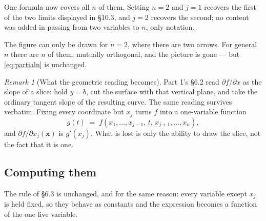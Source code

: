 \documentclass[11pt]{article}
\theoremstyle{plain}
\theoremstyle{definition}
\theoremstyle{remark}
\newtheorem*{rmk}{Remark}
\newcommand{\vc}[1]{\mathbf{#1}}
\begin{document}
\noindent One formula now covers all $n$ of them. Setting $n=2$ and $j=1$
recovers the first of the two limits displayed in \S10.3, and $j=2$ recovers the
second; no content was added in passing from two variables to $n$, only
notation.

\begin{center}
\end{center}

\noindent The figure can only be drawn for $n=2$, where there are two arrows. For
general $n$ there are $n$ of them, mutually orthogonal, and the picture is gone
--- but \eqref{eq:partialn} is unchanged.

\begin{rmk}[What the geometric reading becomes]
Part 1's \S6.2 read $\partial f/\partial x$ as the slope of a slice: hold $y=b$,
cut the surface with that vertical plane, and take the ordinary tangent slope of
the resulting curve. The same reading survives verbatim. Fixing every coordinate
but $x_j$ turns $f$ into a one-variable function
\[
  g(t) \;=\; f(x_1,\dots,x_{j-1},\,t,\,x_{j+1},\dots,x_n),
\]
and $\partial f/\partial x_j(\vc{x})$ is $g'(x_j)$. What is lost is only the
ability to draw the slice, not the fact that it is one.
\end{rmk}

\subsection{Computing them}
The rule of \S6.3 is unchanged, and for the same reason: every variable except
$x_j$ is held fixed, so they behave as constants and the expression becomes a
function of the one live variable.
\end{document}
